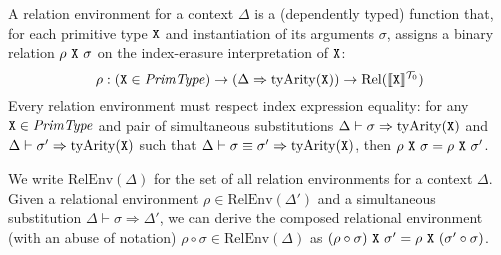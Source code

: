 A relation environment for a context $\Delta$ is a
(dependently typed) function that, for each primitive type
$\texttt{X}$ and instantiation of its arguments $\sigma$, assigns a
binary relation $\rho\ \tyPrimNm{X}\ \sigma$ on the index-erasure
interpretation of $\texttt{X}$:
\begin{displaymath}
  \rho : (\texttt{X} \in \mathit{PrimType}) \to (\Delta \Rightarrow \mathrm{tyArity}(\texttt{X})) \to \mathrm{Rel}(\llbracket \texttt{X} \rrbracket^{\mathcal{T}_0})
\end{displaymath}
Every relation environment must respect index expression equality: for
any $\texttt{X} \in \mathit{PrimType}$ and pair of simultaneous
substitutions $\Delta \vdash \sigma \Rightarrow
\mathrm{tyArity}(\texttt{X})$ and $\Delta \vdash \sigma' \Rightarrow
\mathrm{tyArity}(\texttt{X})$ such that $\Delta \vdash \sigma \equiv
\sigma' \Rightarrow \mathrm{tyArity}(\texttt{X})$, then $\rho\
\texttt{X}\ \sigma = \rho\ \texttt{X}\ \sigma'$.


We write $\mathrm{RelEnv}(\Delta)$ for the set of all relation
environments for a context $\Delta$. Given a relational environment
$\rho \in \mathrm{RelEnv}(\Delta')$ and a simultaneous substitution
$\Delta \vdash \sigma \Rightarrow \Delta'$, we can derive the composed
relational environment (with an abuse of notation) $\rho \circ \sigma
\in \mathrm{RelEnv}(\Delta)$ as $(\rho \circ \sigma)\ \texttt{X}\
\sigma' = \rho\ \texttt{X}\ (\sigma' \circ \sigma)$.


